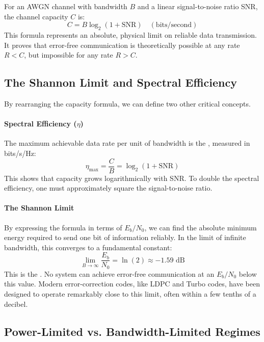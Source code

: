 \begin{keyconcept}
    For an AWGN channel with bandwidth $B$ and a linear signal-to-noise ratio SNR, the channel capacity $C$ is:
    \[ C = B \log_2(1 + \text{SNR}) \quad (\text{bits/second}) \]
    This formula represents an absolute, physical limit on reliable data transmission. It proves that error-free communication is theoretically possible at any rate $R < C$, but impossible for any rate $R > C$.
\end{keyconcept}


\subsection{The Shannon Limit and Spectral Efficiency}

By rearranging the capacity formula, we can define two other critical concepts.

\paragraph{Spectral Efficiency ($\eta$)}
The maximum achievable data rate per unit of bandwidth is the , measured in bits/s/Hz:
\begin{equation}
    \eta_{\max} = \frac{C}{B} = \log_2(1 + \text{SNR})
\end{equation}
This shows that capacity grows logarithmically with SNR. To double the spectral efficiency, one must approximately square the signal-to-noise ratio.

\paragraph{The Shannon Limit}
By expressing the formula in terms of $E_b/N_0$, we can find the absolute minimum energy required to send one bit of information reliably. In the limit of infinite bandwidth, this converges to a fundamental constant:
\begin{equation}
    \lim_{B \to \infty} \frac{E_b}{N_0} = \ln(2) \approx -1.59 \text{ dB}
\end{equation}
This is the . No system can achieve error-free communication at an $E_b/N_0$ below this value. Modern error-correction codes, like LDPC and Turbo codes, have been designed to operate remarkably close to this limit, often within a few tenths of a decibel.


\subsection{Power-Limited vs. Bandwidth-Limited Regimes}

